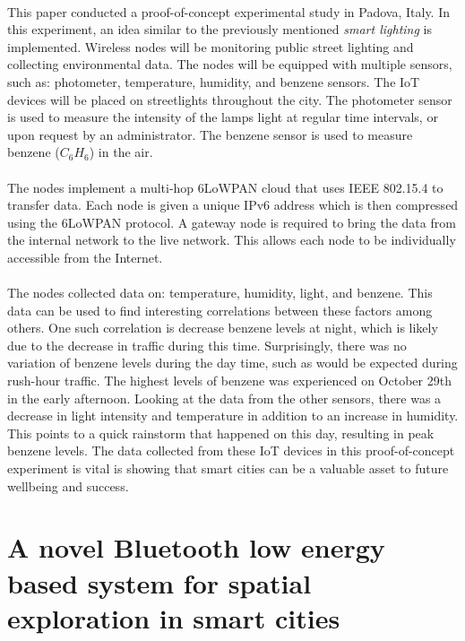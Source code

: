 \documentclass[a4paper,12pt]{article}
\begin{document}
\paragraph{}
This paper conducted a proof-of-concept experimental study in Padova, Italy. In this experiment, an idea similar to the previously mentioned \textit{smart lighting} is implemented. Wireless nodes will be monitoring public street lighting and collecting environmental data. The nodes will be equipped with multiple sensors, such as: photometer, temperature, humidity, and benzene sensors. The IoT devices will be placed on streetlights throughout the city. The photometer sensor is used to measure the intensity of the lamps light at regular time intervals, or upon request by an administrator. The benzene sensor is used to measure benzene ($C_6H_6$) in the air. 
\paragraph{}
The nodes implement a multi-hop 6LoWPAN cloud that uses IEEE 802.15.4 to transfer data. Each node is given a unique IPv6 address which is then compressed using the 6LoWPAN protocol. A gateway node is required to bring the data from the internal network to the live network. This allows each node to be individually accessible from the Internet.
\paragraph{}
The nodes collected data on: temperature, humidity, light, and benzene. This data can be used to find interesting correlations between these factors among others. One such correlation is decrease benzene levels at night, which is likely due to the decrease in traffic during this time. Surprisingly, there was no variation of benzene levels during the day time, such as would be expected during rush-hour traffic. The highest levels of benzene was experienced on October 29th in the early afternoon. Looking at the data from the other sensors, there was a decrease in light intensity and temperature in addition to an increase in humidity. This points to a quick rainstorm that happened on this day, resulting in peak benzene levels. The data collected from these IoT devices in this proof-of-concept experiment is vital is showing that smart cities can be a valuable asset to future wellbeing and success.

\section*{A novel Bluetooth low energy based system for spatial exploration in smart cities}
\end{document}
